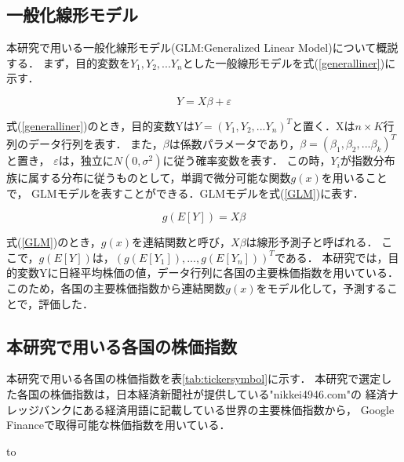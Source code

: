 \documentclass[submit,techrep,noauthor]{ipsj}
\begin{document}
\subsection{一般化線形モデル}
本研究で用いる一般化線形モデル(GLM:Generalized Linear Model)について概説する．
まず，目的変数を$ Y_{1},Y_{2},...Y_{n}$とした一般線形モデルを式(\ref{generalliner})に示す．

\begin{equation}
\label{generalliner}
Y=X \beta + \varepsilon 
\end{equation}

式(\ref{generalliner})のとき，目的変数Yは$Y=(Y_{1},Y_{2},...Y_{n})^{T}$と置く．Xは$n \times K$行列のデータ行列を表す．
また，$ \beta $は係数パラメータであり，$\beta=( \beta_{1}, \beta_{2},... \beta_{k})^{T}$と置き，
$\varepsilon$は，独立に$N(0, \sigma^{2})$に従う確率変数を表す．
%
この時，$Y_{i}$が指数分布族に属する分布に従うものとして，単調で微分可能な関数$g(x)$を用いることで，
GLMモデルを表すことができる．GLMモデルを式(\ref{GLM})に表す．

\begin{equation}
\label{GLM}
g(E[Y])=X \beta 
\end{equation}

式(\ref{GLM})のとき，$g(x)$を連結関数と呼び，$X \beta $は線形予測子と呼ばれる．
ここで，$g(E[Y])$は，$(g(E[Y_{1}]),...,g(E [Y_{n}]))^{T}$である．
本研究では，目的変数Yに日経平均株価の値，データ行列に各国の主要株価指数を用いている．
このため，各国の主要株価指数から連結関数$g(x)$をモデル化して，予測することで，評価した．

\subsection{本研究で用いる各国の株価指数}
本研究で用いる各国の株価指数を表\ref{tab:tickersymbol}に示す．
本研究で選定した各国の株価指数は，日本経済新聞社が提供している"nikkei4946.com"の
経済ナレッジバンクにある経済用語に記載している世界の主要株価指数から，
Google Financeで取得可能な株価指数を用いている．

\begin{table}[h] 
\caption{各国における主要な株価指数} 
\label{tab:tickersymbol}
\hbox to
\end{table}
\end{document}

